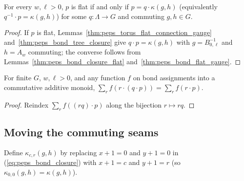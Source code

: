 \begin{lemma}%
    \label{thm:peps_bond_flat_classification}
    \leanok
    For every $w,\ell>0$, $p$ is flat if and only if $p=q\cdot\kappa(g,h)$ (equivalently $q^{-1}\cdot p=\kappa(g,h)$) for some $q:\Lambda\to G$ and commuting $g,h\in G$.
\end{lemma}
\begin{proof}\leanok
    If $p$ is flat, Lemmas~\ref{thm:peps_torus_flat_connection_gauge} and~\ref{thm:peps_bond_tree_closure} give $q\cdot p=\kappa(g,h)$ with $g=B_{0,\ell}^{-1}$ and $h=A_w$ commuting; the converse follows from Lemmas~\ref{thm:peps_bond_closure_flat} and~\ref{thm:peps_bond_flat_gauge}.
\end{proof}

\begin{lemma}%
    \label{thm:peps_bond_gauge_average}
    \leanok
    For finite $G$, $w,\ell>0$, and any function $f$ on bond assignments into a commutative additive monoid, $\sum_r f(r\cdot(q\cdot p))=\sum_r f(r\cdot p)$.
\end{lemma}
\begin{proof}\leanok
    Reindex $\sum_r f((rq)\cdot p)$ along the bijection $r\mapsto rq$.
\end{proof}

\subsection{Moving the commuting seams}

\begin{definition}%
    \label{def:peps_bond_closure_at}
    \leanok
    Define $\kappa_{c,r}(g,h)$ by replacing $x+1=0$ and $y+1=0$ in (\ref{eq:peps_bond_closure}) with $x+1=c$ and $y+1=r$ (so $\kappa_{0,0}(g,h)=\kappa(g,h)$).
\end{definition}

